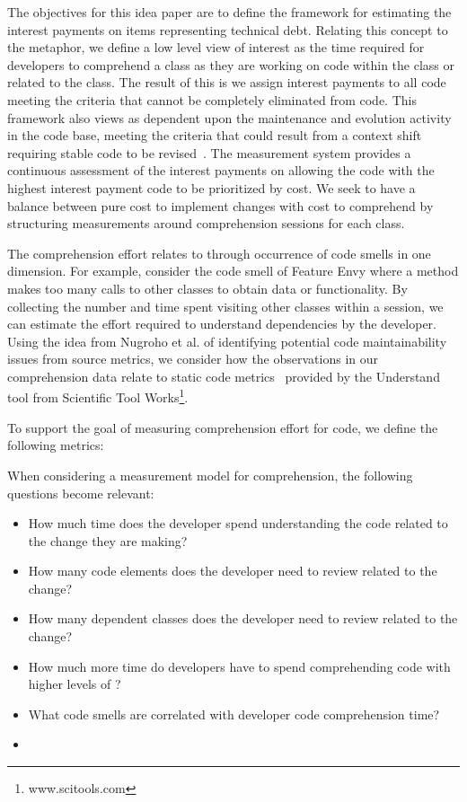 The objectives for this idea paper are to define the framework for estimating the interest payments on items representing technical debt.  Relating this concept to the \TD  metaphor, we define a low level view of interest as the time required for developers to comprehend a class as they are working on code within the class or related to the class.   The result of this is we assign interest payments to all code meeting the criteria that \TD cannot be completely eliminated from code.  This framework also views \TD as dependent upon the maintenance and evolution activity in the code base, meeting the criteria that \TD could result from a context shift requiring stable code to be revised~\cite{Ozkaya2012Technical}. The measurement system provides a continuous assessment of the interest payments on \TD allowing the code with the highest interest payment code to be prioritized by cost.  We seek to have a balance between pure cost to implement changes with cost to comprehend by structuring measurements around comprehension sessions for each class.

The comprehension effort relates to \TD through occurrence of code smells in one dimension.  For example, consider the code smell of Feature Envy where a method makes too many calls to other classes to obtain data or functionality.  By collecting the number and time spent visiting other classes within a session, we can estimate the effort required to understand dependencies by the developer.  Using the idea from Nugroho et al. of identifying potential code maintainability issues from source metrics, we consider how the observations in our comprehension data relate to static code metrics~\cite{Nugroho_etal:2011} provided by the Understand tool from Scientific Tool Works\footnote{www.scitools.com}.  



To support the goal of measuring comprehension effort for code, we define the following metrics:

When considering a measurement model for comprehension, the following questions become relevant:

\begin{itemize}
	\item[] How much time does the developer spend understanding the code related to the change they are making?
	\item[] How many code elements does the developer need to review related to the change?
	\item[] How many dependent classes does the developer need to review related to the change?
	\item[] How much more time do developers have to spend comprehending code with higher levels of \TD?
	\item[] What code smells are correlated with developer code comprehension time?
	\item[] 
\end{itemize}

